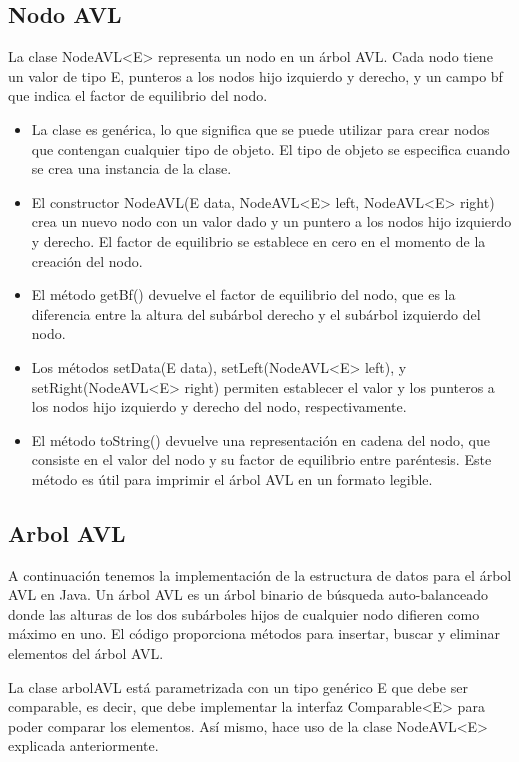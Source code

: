 \documentclass{article}
\begin{document}
            \subsection{Nodo AVL}
                La clase NodeAVL<E> representa un nodo en un árbol AVL. Cada nodo tiene un valor de tipo E, punteros a los nodos hijo izquierdo y derecho, y un campo bf que indica el factor de equilibrio del nodo.
                \begin{itemize}
                    \item La clase es genérica, lo que significa que se puede utilizar para crear nodos que contengan cualquier tipo de objeto. El tipo de objeto se especifica cuando se crea una instancia de la clase.
                    \item El constructor NodeAVL(E data, NodeAVL<E> left, NodeAVL<E> right) crea un nuevo nodo con un valor dado y un puntero a los nodos hijo izquierdo y derecho. El factor de equilibrio se establece en cero en el momento de la creación del nodo.
                    \item El método getBf() devuelve el factor de equilibrio del nodo, que es la diferencia entre la altura del subárbol derecho y el subárbol izquierdo del nodo.
                    \item Los métodos setData(E data), setLeft(NodeAVL<E> left), y setRight(NodeAVL<E> right) permiten establecer el valor y los punteros a los nodos hijo izquierdo y derecho del nodo, respectivamente.
                    \item El método toString() devuelve una representación en cadena del nodo, que consiste en el valor del nodo y su factor de equilibrio entre paréntesis. Este método es útil para imprimir el árbol AVL en un formato legible.
                \end{itemize}
            \subsection{Arbol AVL}
                A continuación tenemos la implementación de la estructura de datos para el árbol AVL en Java. Un árbol AVL es un árbol binario de búsqueda auto-balanceado donde las alturas de los dos subárboles hijos de cualquier nodo difieren como máximo en uno. El código proporciona métodos para insertar, buscar y eliminar elementos del árbol AVL.

                La clase arbolAVL está parametrizada con un tipo genérico E que debe ser comparable, es decir, que debe implementar la interfaz Comparable<E> para poder comparar los elementos. Así mismo, hace uso de la clase NodeAVL<E> explicada anteriormente.
\end{document}
